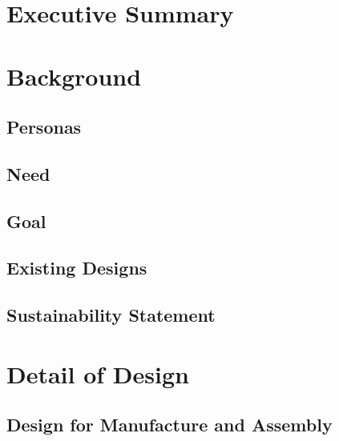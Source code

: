 \documentclass{article}
\begin{document}
\maketitle
\newpage

\section{Executive Summary}




\newpage
\tableofcontents
\newpage

\section{Background}
\subsection{Personas}






\subsection{Need}

\subsection{Goal}


\subsection{Existing Designs}

\subsection{Sustainability Statement}

\section{Detail of Design}
\subsection{Design for Manufacture and Assembly}

\end{document}
